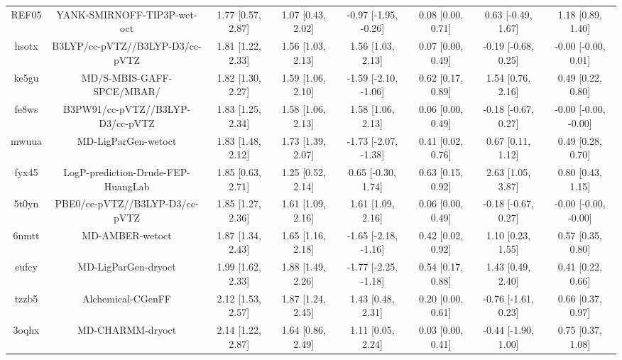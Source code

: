 \documentclass{article}
\begin{document}
\begin{center}
\begin{longtable}{|cccccccc|}
 REF05 &                        YANK-SMIRNOFF-TIP3P-wet-oct &  1.77 [0.57, 2.87] &  1.07 [0.43, 2.02] &  -0.97 [-1.95, -0.26] &  0.08 [0.00, 0.71] &   0.63 [-0.49, 1.67] &     1.18 [0.89, 1.40] \\
 hsotx &                    B3LYP/cc-pVTZ//B3LYP-D3/cc-pVTZ &  1.81 [1.22, 2.33] &  1.56 [1.03, 2.13] &     1.56 [1.03, 2.13] &  0.07 [0.00, 0.49] &  -0.19 [-0.68, 0.25] &   -0.00 [-0.00, 0.01] \\
 ke5gu &                          MD/S-MBIS-GAFF-SPCE/MBAR/ &  1.82 [1.30, 2.27] &  1.59 [1.06, 2.10] &  -1.59 [-2.10, -1.06] &  0.62 [0.17, 0.89] &    1.54 [0.76, 2.16] &     0.49 [0.22, 0.80] \\
 fe8ws &                   B3PW91/cc-pVTZ//B3LYP-D3/cc-pVTZ &  1.83 [1.25, 2.34] &  1.58 [1.06, 2.13] &     1.58 [1.06, 2.13] &  0.06 [0.00, 0.49] &  -0.18 [-0.67, 0.27] &  -0.00 [-0.00, -0.00] \\
 mwuua &                                MD-LigParGen-wetoct &  1.83 [1.48, 2.12] &  1.73 [1.39, 2.07] &  -1.73 [-2.07, -1.38] &  0.41 [0.02, 0.76] &    0.67 [0.11, 1.12] &     0.49 [0.28, 0.70] \\
 fyx45 &                 LogP-prediction-Drude-FEP-HuangLab &  1.85 [0.63, 2.71] &  1.25 [0.52, 2.14] &    0.65 [-0.30, 1.74] &  0.63 [0.15, 0.92] &    2.63 [1.05, 3.87] &     0.80 [0.43, 1.15] \\
 5t0yn &                     PBE0/cc-pVTZ//B3LYP-D3/cc-pVTZ &  1.85 [1.27, 2.36] &  1.61 [1.09, 2.16] &     1.61 [1.09, 2.16] &  0.06 [0.00, 0.49] &  -0.18 [-0.67, 0.27] &  -0.00 [-0.00, -0.00] \\
 6nmtt &                                    MD-AMBER-wetoct &  1.87 [1.34, 2.43] &  1.65 [1.16, 2.18] &  -1.65 [-2.18, -1.16] &  0.42 [0.02, 0.92] &    1.10 [0.23, 1.55] &     0.57 [0.35, 0.80] \\
 eufcy &                                MD-LigParGen-dryoct &  1.99 [1.62, 2.33] &  1.88 [1.49, 2.26] &  -1.77 [-2.25, -1.18] &  0.54 [0.17, 0.88] &    1.43 [0.49, 2.40] &     0.41 [0.22, 0.66] \\
 tzzb5 &                                  Alchemical-CGenFF &  2.12 [1.53, 2.57] &  1.87 [1.24, 2.45] &     1.43 [0.48, 2.31] &  0.20 [0.00, 0.61] &  -0.76 [-1.61, 0.23] &     0.66 [0.37, 0.97] \\
 3oqhx &                                   MD-CHARMM-dryoct &  2.14 [1.22, 2.87] &  1.64 [0.86, 2.49] &     1.11 [0.05, 2.24] &  0.03 [0.00, 0.41] &  -0.44 [-1.90, 1.00] &     0.75 [0.37, 1.08] \\

\end{longtable}
\end{center}
\end{document}
